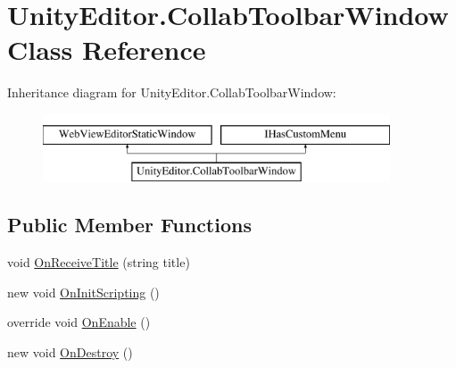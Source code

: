 \hypertarget{class_unity_editor_1_1_collab_toolbar_window}{}\section{Unity\+Editor.\+Collab\+Toolbar\+Window Class Reference}
\label{class_unity_editor_1_1_collab_toolbar_window}
Inheritance diagram for Unity\+Editor.\+Collab\+Toolbar\+Window\+:\begin{figure}[H]
\begin{center}
\leavevmode
\includegraphics[height=2.000000cm]{class_unity_editor_1_1_collab_toolbar_window}
\end{center}
\end{figure}
\subsection*{Public Member Functions}
\begin{DoxyCompactItemize}
\item 
void \mbox{\hyperlink{class_unity_editor_1_1_collab_toolbar_window_a4f61d2643dcb59aff9a540469efcc015}{On\+Receive\+Title}} (string title)
\item 
new void \mbox{\hyperlink{class_unity_editor_1_1_collab_toolbar_window_ae7b4092311175970f6a98a57ce9882fa}{On\+Init\+Scripting}} ()
\item 
override void \mbox{\hyperlink{class_unity_editor_1_1_collab_toolbar_window_ab0a96d7e339ce22cf5d39872445c2828}{On\+Enable}} ()
\item 
new void \mbox{\hyperlink{class_unity_editor_1_1_collab_toolbar_window_ae83695cc4df5e99d568cc76a85113f6a}{On\+Destroy}} ()
\end{DoxyCompactItemize}
